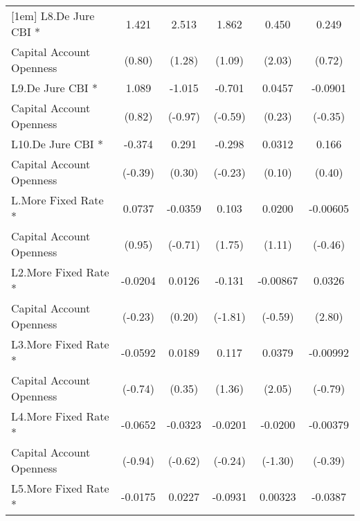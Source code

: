 {\begin{tabular}{l*{5}{c}}
[1em]
L8.De Jure CBI *    &       1.421         &       2.513         &       1.862         &       0.450\sym{*}  &       0.249         \\
Capital Account Openness&      (0.80)         &      (1.28)         &      (1.09)         &      (2.03)         &      (0.72)         \\
[1em]
L9.De Jure CBI *    &       1.089         &      -1.015         &      -0.701         &      0.0457         &     -0.0901         \\
Capital Account Openness&      (0.82)         &     (-0.97)         &     (-0.59)         &      (0.23)         &     (-0.35)         \\
[1em]
L10.De Jure CBI *   &      -0.374         &       0.291         &      -0.298         &      0.0312         &       0.166         \\
Capital Account Openness&     (-0.39)         &      (0.30)         &     (-0.23)         &      (0.10)         &      (0.40)         \\
[1em]
L.More Fixed Rate * &      0.0737         &     -0.0359         &       0.103         &      0.0200         &    -0.00605         \\
Capital Account Openness&      (0.95)         &     (-0.71)         &      (1.75)         &      (1.11)         &     (-0.46)         \\
[1em]
L2.More Fixed Rate *&     -0.0204         &      0.0126         &      -0.131         &    -0.00867         &      0.0326\sym{**} \\
Capital Account Openness&     (-0.23)         &      (0.20)         &     (-1.81)         &     (-0.59)         &      (2.80)         \\
[1em]
L3.More Fixed Rate *&     -0.0592         &      0.0189         &       0.117         &      0.0379\sym{*}  &    -0.00992         \\
Capital Account Openness&     (-0.74)         &      (0.35)         &      (1.36)         &      (2.05)         &     (-0.79)         \\
[1em]
L4.More Fixed Rate *&     -0.0652         &     -0.0323         &     -0.0201         &     -0.0200         &    -0.00379         \\
Capital Account Openness&     (-0.94)         &     (-0.62)         &     (-0.24)         &     (-1.30)         &     (-0.39)         \\
[1em]
L5.More Fixed Rate *&     -0.0175         &      0.0227         &     -0.0931         &     0.00323         &     -0.0387\sym{**} \\

\end{tabular}}
